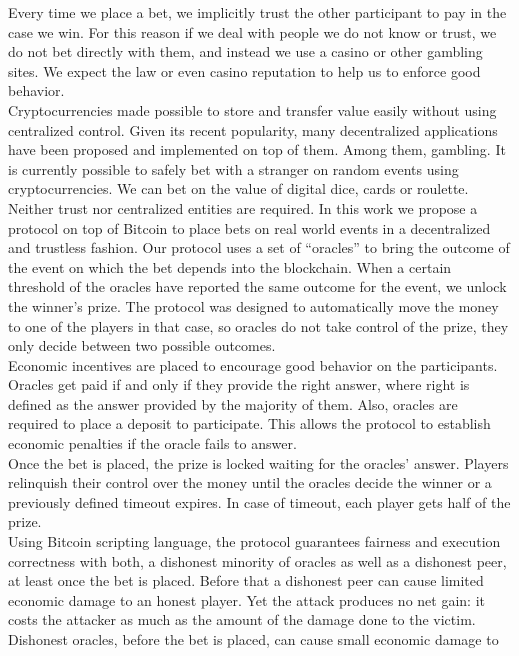 Every time we place a bet, we implicitly trust the other participant  to pay in
  the case we win.
For this reason if we deal with people we do not know or trust, we do not bet
  directly with them, and instead we use a casino or other gambling sites.
We expect the law or even casino reputation to help us to enforce good
  behavior.\\
\noindent
Cryptocurrencies made possible to store and transfer value easily without
  using centralized control.
Given its recent popularity, many decentralized applications have been proposed
  and implemented on top of them.
Among them, gambling.
It is currently possible to safely bet with a stranger on random events
  using cryptocurrencies.
We can bet on the value of digital dice, cards or roulette.
Neither trust nor centralized entities are required.
In this work we propose a protocol on top of Bitcoin to place bets on real world
  events in a decentralized and trustless fashion.
\noindent
Our protocol uses a set of ``oracles'' to bring the outcome of the event on which
  the bet depends into the blockchain.
When a certain threshold of the oracles have reported the same outcome for
  the event, we unlock the winner's prize.
The protocol was designed to automatically move the money to one of the players
  in that case, so oracles do not take control of the prize, they only decide
  between two possible outcomes.\\
\noindent
Economic incentives are placed to encourage good behavior on the participants.
Oracles get paid if and only if they provide the right answer, where right is
  defined as the answer provided by the majority of them.
Also, oracles are required to place a deposit to participate.
This allows the protocol to establish economic penalties if the oracle fails to
  answer.\\
\noindent
Once the bet is placed, the prize is locked waiting for the oracles' answer.
Players relinquish their control over the money until the oracles decide the
  winner or a previously defined timeout expires.
In case of timeout, each player gets half of the prize.\\
\noindent
Using Bitcoin scripting language, the protocol guarantees fairness and execution
  correctness with both, a dishonest minority of oracles as well as a dishonest
  peer, at least once the bet is placed.
Before that a dishonest peer can cause limited economic damage to an honest
  player.
Yet the attack produces no net gain: it costs the attacker as much as the amount
  of the damage done to the victim.
Dishonest oracles, before the bet is placed, can cause small economic damage to
